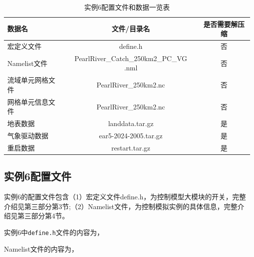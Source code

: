 \begin{table}[htbp]
\caption{实例6配置文件和数据一览表}
\centering \renewcommand{\arraystretch}{1.5}
\label{ex1table}
\begin{tabular}{lcc}
\toprule
\textbf{数据名} & \textbf{文件/目录名} & \textbf{是否需要解压缩} \\\midrule
宏定义文件 & define.h & 否 \\
Namelist文件 & PearlRiver\_Catch\_250km2\_PC\_VG .nml & 否 \\
流域单元网格文件 & PearlRiver\_250km2.nc & 否\\
网格单元信息文件 & PearlRiver\_250km2.nc & 否 \\
地表数据 & landdata.tar.gz & 是 \\
气象驱动数据 & ear5-2024-2005.tar.gz & 是 \\
重启数据 & restart.tar.gz & 是 \\

\bottomrule
\end{tabular}
\end{table}

\subsection{实例6配置文件}
实例6的配置文件包含（1）宏定义文件define.h，为控制模型大模块的开关，完整介绍见第三部分第3节;（2）Namelist文件，为控制模拟实例的具体信息，完整介绍见第三部分第4节。

实例6中\texttt{define.h}文件的内容为，


Namelist文件的内容为，


